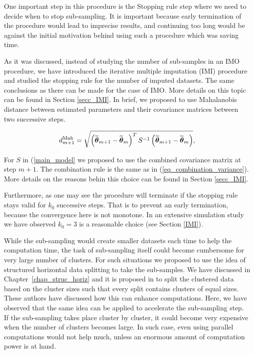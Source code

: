 \documentclass[11pt,a5paper,twoside]{book}
\newcommand{\bftheta}{\mbox{\boldmath $\theta$}}
\begin{document}
One important step in this procedure is the Stopping rule step where we need to decide when to stop sub-sampling. It is important because early termination of the procedure would lead to imprecise results, and continuing too long would be against the initial motivation behind using such a procedure which was saving time. 

As it was discussed, instead of studying the number of sub-samples in an IMO procedure, we have introduced the iterative multiple imputation (IMI) procedure and studied the stopping rule for the number of imputed datasets. The same conclusions as there can be made for the case of IMO. More details on this topic can be found in Section \ref{secc_IMI}. In brief, we proposed to use Mahalanobis distance \citep{mahalanobis1936} between estimated parameters and their covariance matrices between two successive steps. 

\begin{equation}
\label{mal_dis0}
d_{m+1}^{\mathrm{Mah}} = \sqrt{\left(\widetilde{\bftheta}_{m+1}- \widetilde{\bftheta}_{m}\right)^T S^{-1} \left(\widetilde{\bftheta}_{m+1}- \widetilde{\bftheta}_{m}\right)},
\end{equation}

For $S$ in (\ref{main_model} we proposed to use the combined covariance matrix at step $m+1$. The combination rule is the same as in (\ref{eq_combination_variance}). More details on the reasons behin this choice can be found in Section \ref{secc_IMI}.

Furthermore, as one may see the procedure will terminate if the stopping rule stays valid for $k_0$ successive steps. That is to prevent an early termination, because the convergence here is not monotone. In an extensive simulation study we have observed $k_0=3$ is a reasonable choice (see Section \ref{IMI}).

While the sub-sampling would create smaller datasets each time to help the computation time, the task of sub-sampling itself could become cumbersome for very large number of clusters. For such situations we proposed to use the idea of structured horizontal data splitting to take the sub-samples. We have discussed in Chapter~\ref{chap_struc_horiz} and it is proposed in \cite{Lisa2016_2,Lisa2016_3} to split the clustered data based on the cluster sizes such that every split contains clusters of equal sizes. These authors have discussed how this can enhance computations. Here, we have observed that the same idea can be applied to accelerate the sub-sampling step. If the sub-sampling takes place cluster by cluster, it could become very expensive when the number of clusters becomes large. In such case, even using parallel computations would not help much, unless an enormous amount of computation power is at hand. 
\end{document}
